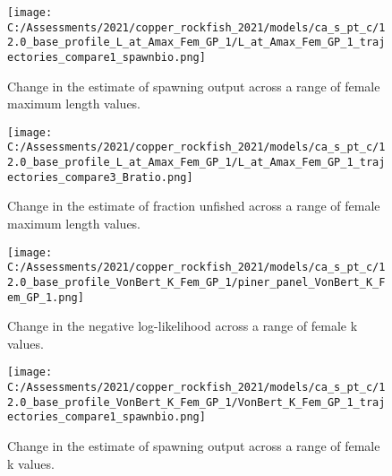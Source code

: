 \documentclass[11pt,
  english,
  a4paper,
]{article}
\begin{document}
\tagmcend\tagstructend


\begin{figure}
\centering
\texttt{[image: C:/Assessments/2021/copper\_rockfish\_2021/models/ca\_s\_pt\_c/12.0\_base\_profile\_L\_at\_Amax\_Fem\_GP\_1/L\_at\_Amax\_Fem\_GP\_1\_trajectories\_compare1\_spawnbio.png]}
\caption{Change in the estimate of spawning output across a range of female maximum length values.\label{fig:linf-ssb}}
\end{figure}

\tagmcend\tagstructend


\begin{figure}
\centering
\texttt{[image: C:/Assessments/2021/copper\_rockfish\_2021/models/ca\_s\_pt\_c/12.0\_base\_profile\_L\_at\_Amax\_Fem\_GP\_1/L\_at\_Amax\_Fem\_GP\_1\_trajectories\_compare3\_Bratio.png]}
\caption{Change in the estimate of fraction unfished across a range of female maximum length values.\label{fig:linf-depl}}
\end{figure}

\tagmcend\tagstructend


\begin{figure}
\centering
\texttt{[image: C:/Assessments/2021/copper\_rockfish\_2021/models/ca\_s\_pt\_c/12.0\_base\_profile\_VonBert\_K\_Fem\_GP\_1/piner\_panel\_VonBert\_K\_Fem\_GP\_1.png]}
\caption{Change in the negative log-likelihood across a range of female k values.\label{fig:k-profile}}
\end{figure}

\tagmcend\tagstructend


\begin{figure}
\centering
\texttt{[image: C:/Assessments/2021/copper\_rockfish\_2021/models/ca\_s\_pt\_c/12.0\_base\_profile\_VonBert\_K\_Fem\_GP\_1/VonBert\_K\_Fem\_GP\_1\_trajectories\_compare1\_spawnbio.png]}
\caption{Change in the estimate of spawning output across a range of female k values.\label{fig:k-ssb}}
\end{figure}
\end{document}

